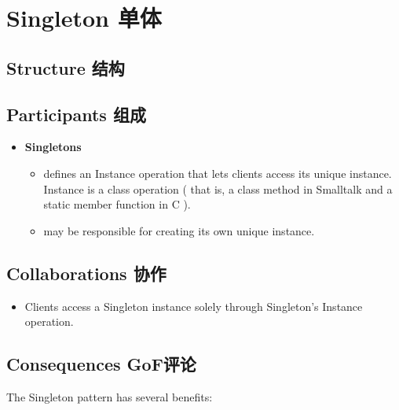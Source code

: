 \section{Singleton 单体}

\subsection{Structure 结构}


\subsection{Participants 组成}

\begin{itemize}
\small
	\item \textbf{Singletons}
	\begin{itemize}
	
		\item defines an Instance operation that lets clients access its unique instance. Instance is a class operation ( that is, a class method in Smalltalk and a static member function in C ).

		\item may be responsible for creating its own unique instance.

	\end{itemize}
\normalize
\end{itemize}

\subsection{Collaborations 协作}

\begin{itemize}

	\item Clients access a Singleton instance solely through Singleton's Instance operation.

\end{itemize}

\subsection{Consequences GoF评论}

The Singleton pattern has several benefits:

